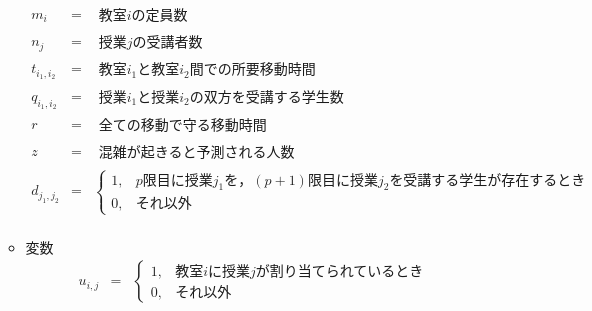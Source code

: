 \documentclass[12pt, a4paper, fleqn]{jreport}
\begin{document}
\begin{itemize}
\begin{itemize}
\[\begin{array}{rcl}
m_{i} & = & 
\begin{array}{ll}
 \mbox{教室$i$の定員数} 
\end{array}
\\


n_{j} & = & 
\begin{array}{ll}
 \mbox{授業$j$の受講者数} 
\end{array}
\\


t_{i_1,i_2} & = & 
\begin{array}{ll}
 \mbox{教室$i_1$と教室$i_2$間での所要移動時間} 
\end{array}
\\


q_{i_1,i_2} & = & 
\begin{array}{ll}
 \mbox{授業$i_1$と授業$i_2$の双方を受講する学生数} 
\end{array}
\\


r & = & 
\begin{array}{ll}
 \mbox{全ての移動で守る移動時間} 
\end{array}
\\


z & = & 
\begin{array}{ll}
 \mbox{混雑が起きると予測される人数} 
\end{array}
\\


d_{j_1,j_2} & = & \left\{ 
\begin{array}{ll}
	1, & \mbox{$p$限目に授業$j_1$を，$(p+1)$限目に授業$j_2$を受講する学生が存在するとき} 		\\
	0, & \mbox{それ以外}
\end{array}
\right. \\


\end{array}
\]


\vspace{5.0mm}
\item 変数\\
\[
\begin{array}{rcl}


 u_{i,j} & = & \left\{ 
\begin{array}{ll}
1, & \mbox{教室$i$に授業$j$が割り当てられているとき} \\
0, & \mbox{それ以外}
\end{array}
\right. \\



\end{array}\]
\end{itemize}
\end{itemize}
\end{document}
